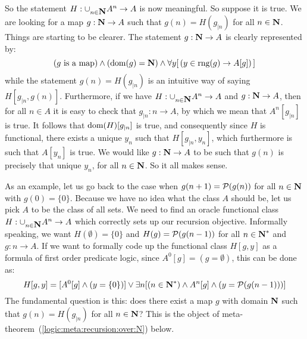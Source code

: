 So the statement $H:\cup_{n\in\mbox{$\bf N$}}A^{n}\to A$ is now meaningful. So
suppose it is true. We are looking for a map $g:\mbox{$\bf N$}\to A$ such that
$g(n)=H(g_{|n})$ for all $n\in\mbox{$\bf N$}$. Things are starting to be
clearer. The statement $g:\mbox{$\bf N$}\to A$ is clearly represented by:
    \[
    (g\mbox{\ is a map})\land(\mbox{\rm dom}(g)=\mbox{$\bf N$})\land\forall y[\,(y\in\mbox{\rm rng}(g)\to A[g])\,]
    \]
while the statement $g(n)=H(g_{|n})$ is an intuitive way of saying
$H[g_{|n},g(n)]$. Furthermore, if we have $H:\cup_{n\in\mbox{$\bf N$}}A^{n}\to
A$ and $g:\mbox{$\bf N$}\to A$, then for all $n\in A$ it is easy to check that
$g_{|n}:n\to A$, by which we mean that $A^{n}[g_{|n}]$ is true. It
follows that $\mbox{\rm dom}(H)[g_{|n}]$ is true, and consequently since $H$
is functional, there exists a unique $y_{n}$ such that
$H[g_{|n},y_{n}]$, which furthermore is such that $A[y_{n}]$ is
true. We would like $g:\mbox{$\bf N$}\to A$ to be such that $g(n)$ is precisely
that unique $y_{n}$, for all $n\in\mbox{$\bf N$}$. So it all makes sense.

As an example, let us go back to the case when $g(n+1)={\cal
P}(g(n))$ for all $n\in\mbox{$\bf N$}$ with $g(0)=\{0\}$. Because we have no
idea what the class $A$ should be, let us pick $A$ to be the class
of all sets. We need to find an oracle functional class
$H:\cup_{n\in\mbox{$\bf N$}}A^{n}\to A$ which correctly sets up our recursion
objective. Informally speaking, we want $H(\emptyset)=\{0\}$ and
$H(g)={\cal P}(g(n-1))$ for all $n\in\mbox{$\bf N$}^{*}$ and $g:n\to A$. If we
want to formally code up the functional class $H[g,y]$ as a formula
of first order predicate logic, since $A^{0}[g]=(g=\emptyset)$, this
can be done as:
    \[
    H[g,y]=[A^{0}[g]\land(y=\{0\})]\lor\exists n[(n\in\mbox{$\bf N$}^{*})
    \land A^{n}[g]\land (y={\cal P}(g(n-1)))]
    \]
The fundamental question is this: does there exist a map $g$ with
domain $\mbox{$\bf N$}$ such that $g(n)=H(g_{|n})$ for all $n\in\mbox{$\bf N$}$? This is the
object of meta-theorem~(\ref{logic:meta:recursion:over:N}) below.


